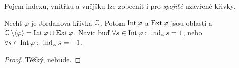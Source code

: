 \begin{note}
Pojem indexu, vnitřku a vnějšku lze zobecnit i pro \emph{spojité} uzavřené křivky.
\end{note}

\begin{theorem}[Jordanova]\label{thm:Jordan}
Nechť $\varphi$ je Jordanova křivka $\operatorname{\mathbb{C}}$. Potom $\operatorname{Int}\varphi$ a $\operatorname{Ext}\varphi$ jsou oblasti a $\operatorname{\mathbb{C}}\setminus\langle\varphi\rangle=\operatorname{Int}\varphi\cup\operatorname{Ext}\varphi$. Navíc buď $\forall s \in \Int\varphi:\ \ind_\varphi s=1$, nebo $\forall s \in \operatorname{Int}\varphi:\ \operatorname{ind}_\varphi s=-1$.
\end{theorem}
\begin{proof}
Těžký, nebude.
\end{proof}